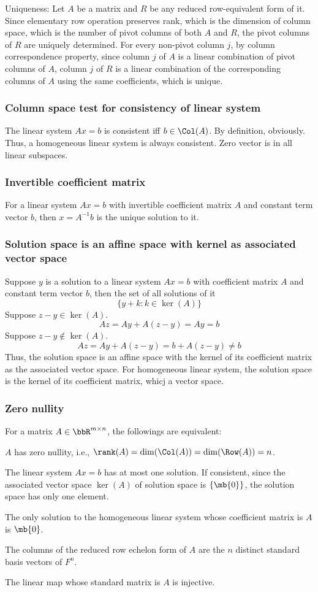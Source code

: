 \documentclass[a4paper,12pt]{report}
\begin{document}
Uniqueness: Let $A$ be a matrix and $R$ be any reduced row-equivalent form of it. Since elementary row operation preserves rank, which is the dimension of column space, which is the number of pivot columns of both $A$ and $R$, the pivot columns of $R$ are uniquely determined. For every non-pivot column $j$, by column correspondence property, since column $j$ of $A$ is a linear combination of pivot columns of $A$, column $j$ of $R$ is a linear combination of the corresponding columns of $A$ using the same coefficients, which is unique.
\epr
\subsubsection{Column space test for consistency of linear system}
The linear system $Ax=b$ is consistent iff $b\in\Col(A)$.
\bpr
By definition, obviously.
\epr
Thus, a homogeneous linear system is always consistent.
\bpr
Zero vector is in all linear subspaces.
\epr
\subsubsection{Invertible coefficient matrix}
For a linear system $Ax=b$ with invertible coefficient matrix $A$ and constant term vector $b$, then $x=A^{-1}b$ is the unique solution to it.
\subsubsection{Solution space is an affine space with kernel as associated vector space}
Suppose $y$ is a solution to a linear system $Ax=b$ with coefficient matrix $A$ and constant term vector $b$, then the set of all solutions of it
\[\{y+k\colon k\in\ker(A)\}\]
\bpr
Suppose $z-y\in\ker(A)$.
\[Az=Ay+A(z-y)=Ay=b\]
Suppose $z-y\notin\ker(A)$.
\[Az=Ay+A(z-y)=b+A(z-y)\ne b\]
\epr
Thus, the solution space is an affine space with the kernel of its coefficient matrix as the associated vector space. For homogeneous linear system, the solution space is the kernel of its coefficient matrix, whicj a vector space.
\subsubsection{Zero nullity}
For a matrix $A\in\bbR^{m\times n}$, the followings are equivalent:
\bit
\item $A$ has zero nullity, i.e., $\rank(A)=\dim(\Col(A))=\dim(\Row(A))=n$.
\item The linear system $Ax=b$ has at most one solution.
\bpr
If consistent, since the associated vector space $\ker(A)$ of solution space is $\{\mb{0}\}$, the solution space has only one element.
\epr
\item The only solution to the homogeneous linear system whose coefficient matrix is $A$ is $\mb{0}$.
\item The columns of the reduced row echelon form of $A$ are the $n$ distinct standard basis vectors of $F^n$.
\item The linear map whose standard matrix is $A$ is injective.
\eit
\end{document}
